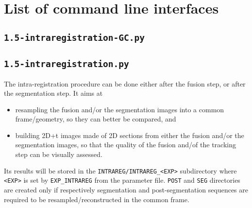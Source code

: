 \section{List of command line interfaces}

%
%


%
%
%


\subsection{\texttt{1.5-intraregistration-GC.py}}

\subsection{\texttt{1.5-intraregistration.py}}

The intra-registration procedure can be done either after the fusion step, or after the segmentation step. It aims at
\begin{itemize}
\item resampling the fusion and/or the segmentation images into a common frame/geometry, so they can better be compared, and
\item building 2D+t images made of 2D sections from either the  fusion and/or the segmentation images, so that the quality of the fusion and/of the tracking step can be visually assessed.
\end{itemize}
Its results will be stored in the \verb|INTRAREG/INTRAREG_<EXP>| subdirectory where \verb|<EXP>| is set by \verb|EXP_INTRAREG| from the parameter file. \verb|POST| and \verb|SEG| directories are created only if respectively segmentation and post-segmentation sequences are required to be resampled/reconstructed in the common frame.


